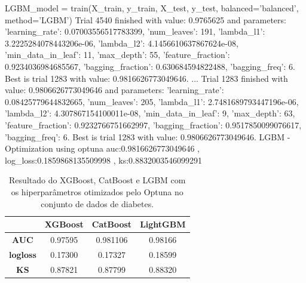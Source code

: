\begin{codigo}[caption={Resultado do Optuna no conjunto de dados de Diabetes.}, label={codigo:res:op:dia}, language=Python, breaklines=true]
LGBM_model = train(X_train, y_train, X_test, y_test, balanced='balanced', method='LGBM')
Trial 4540 finished with value: 0.9765625 and parameters: {'learning_rate': 0.07003556517783399, 'num_leaves': 191, 'lambda_l1': 3.2225284078443206e-06, 'lambda_l2': 4.1456610637867624e-08, 'min_data_in_leaf': 11, 'max_depth': 55, 'feature_fraction': 0.9234036984685567, 'bagging_fraction': 0.630684594822488, 'bagging_freq': 6}. Best is trial 1283 with value: 0.9816626773049646.
...
Trial 1283 finished with value: 0.9806626773049646 and parameters: {'learning_rate': 0.08425779644832665, 'num_leaves': 205, 'lambda_l1': 2.7481689793447196e-06, 'lambda_l2': 4.307867154100011e-08, 'min_data_in_leaf': 9, 'max_depth': 63, 'feature_fraction': 0.9232766751662997, 'bagging_fraction': 0.9517850099076617, 'bagging_freq': 6}. Best is trial 1283 with value: 0.9806626773049646.
LGBM - Optimization using optuna
auc:0.9816626773049646 , log_loss:0.1859868135509998 , ks:0.8832003546099291

\end{codigo}

\begin{table}[H]
\centering
\begin{tabular}{|c|c|c|c|}
\hline
	& \textbf{XGBoost} &\textbf{CatBoost} & \textbf{LightGBM} \\
\hline
\textbf{AUC}	& 0.97595	&0.981106	&0.98166\\
\hline
\textbf{logloss}	& 0.17300&	0.17327	&0.18599\\
\hline
\textbf{KS}	& 0.87821&	0.87799&	0.88320\\
\hline
\end{tabular}
\caption{Resultado do XGBoost, CatBoost e LGBM com os hiperparâmetros otimizados pelo Optuna no conjunto de dados de diabetes.}\label{res:dia:op}
\end{table}


